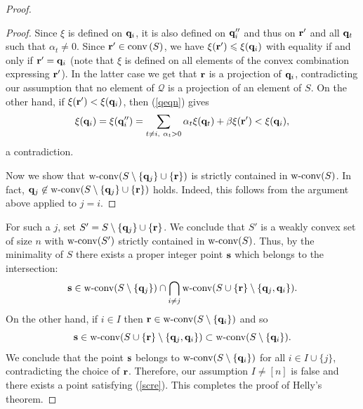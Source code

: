 \documentclass{daj}
\renewcommand{\le}{\leqslant}
\newcommand{\conv}{{\rm conv}\,}
\newcommand{\D}{\mathcal D}
\newcommand{\wc}{\mbox{\rm w-conv}}
\theoremstyle{definition}
\theoremstyle{remark}
\theoremstyle{definition}
\theoremstyle{definition}
\begin{document}
\begin{proof}
\begin{proof}
Since $\xi$ is defined on ${\bf q}_i$, it is also defined on ${\bf q}_i''$ and thus on ${\bf r}'$ and all ${\bf q}_t$ such that $\alpha_t \neq 0$. 
Since ${\bf r}' \in \conv(S)$, we have $\xi({\bf r}') \le \xi({\bf q}_i)$ with equality if and only if ${\bf r}' = {\bf q}_i$ (note that $\xi$ is defined on all elements of the convex combination expressing ${\bf r}'$). In the latter case we get that ${\bf r}$ is a projection of ${\bf q}_i$, contradicting our assumption that no element of $\mathcal Q$ is a projection of an element of $S$.
On the other hand, if $\xi({\bf r'}) < \xi({\bf q}_i)$, then (\ref{qeqn}) gives
\[
 \xi({\bf q}_i) = \xi({\bf q}_i'') = \sum_{t\neq i,~\alpha_t > 0} \alpha_t \xi({\bf q}_t) + \beta \xi({\bf r}') < \xi({\bf q}_i),
\]
a contradiction. %

Now we show that $\wc(S \setminus \{{\bf q}_j\} \cup \{{\bf r}\})$ is strictly contained in $\wc(S)$. In fact, ${\bf q}_j \not \in \wc(S \setminus \{{\bf q}_j\} \cup \{{\bf r}\})$ holds. Indeed, this follows from the argument above applied to $j = i$.
\end{proof}

For such a $j$, set $S' = S \setminus \{{\bf q}_j\} \cup \{{\bf r}\}$. We conclude that $S'$ is a weakly convex set of size $n$ with $\wc(S')$ strictly contained in $\wc(S)$. 
Thus, by the minimality of $S$ there exists a proper integer point ${\bf s}$ which belongs to the intersection:
\begin{equation}\label{inter}
{\bf s} \in \wc(S \setminus \{{\bf q}_j\}) \cap \bigcap_{i \neq  j} \wc(S \cup \{{\bf r}\} \setminus \{{\bf q}_j, {\bf q}_i\}).
\end{equation}
On the other hand, if $i \in I$ then ${\bf r} \in \wc(S \setminus \{{\bf q}_i\})$ and so
$$
{\bf s} \in \wc(S \cup \{{\bf r}\} \setminus \{{\bf q}_j, {\bf q}_i\}) \subset  \wc(S \setminus \{{\bf q}_i\}).
$$
We conclude that the point ${\bf s}$ belongs to $\wc(S \setminus \{{\bf q}_i\})$ for all $i \in I \cup \{j\}$, contradicting the choice of ${\bf r}$. Therefore, our assumption $I \neq [n]$ is false and there exists a point satisfying (\ref{scre}). This completes the proof of Helly's theorem.
\end{proof}
\end{document}
